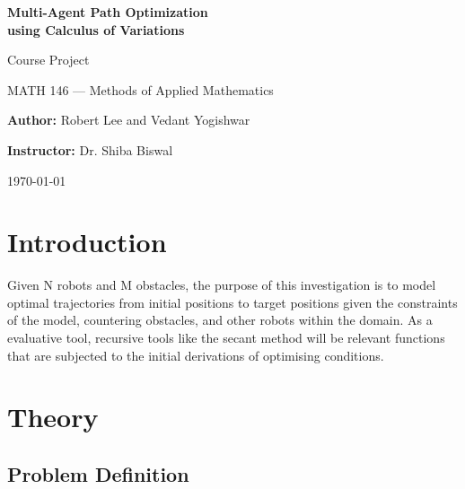 \documentclass[11pt]{article}
\begin{document}
\begin{titlepage}
    \centering
    \null
    
    {\huge \textbf{Multi-Agent Path Optimization\\using Calculus of Variations}\par}
    \vspace{5mm}
    {\Large \large Course Project\par
    MATH 146 --- Methods of Applied Mathematics\par}
    \vspace{5mm}
    {\large \textbf{Author:} Robert Lee and Vedant Yogishwar\par
    \textbf{Instructor:} Dr. Shiba Biswal\par}
    
    
    {\large \today\par}
\end{titlepage}

\clearpage

\tableofcontents

\clearpage

\begin{abstract}
\lipsum[1-2]
\end{abstract}

\clearpage

\printunsrtglossary[type=symbols,style=long,title={List of Symbols}]

\section{Introduction}
Given N robots and M obstacles, the purpose of this investigation is to model optimal trajectories from initial positions to target positions given the constraints of the model, countering obstacles, and other robots within the domain. As a evaluative tool, recursive tools like the secant method will be relevant functions that are subjected to the initial derivations of optimising conditions. 

\section{Theory}

\subsection{Problem Definition}
\end{document}
